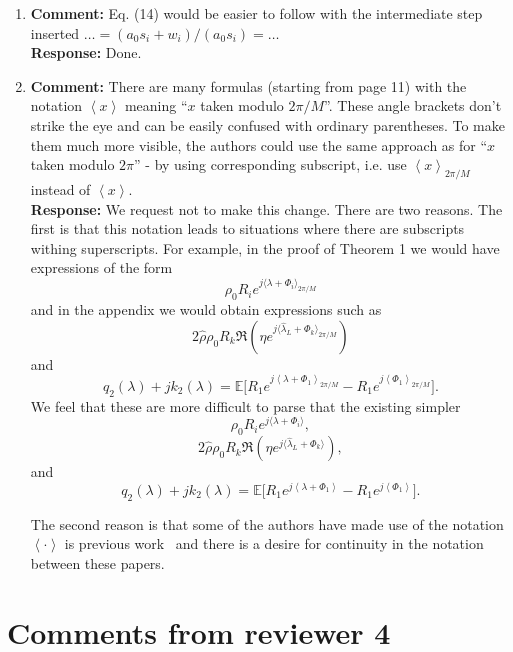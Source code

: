 \documentclass{article}
\newcommand{\fracpart}[1]{\left\langle #1 \right\rangle}
\newcommand{\sfracpart}[1]{\langle #1 \rangle}
\newcommand{\expect}{{\mathbb E}}
\begin{document}
\begin{enumerate}

\item \textbf{Comment:}  Eq. (14) would be easier to follow with the intermediate step inserted $\dots = (a_0s_i + w_i)/(a_0s_i) = \dots$ \\
\textbf{Response:} Done.

\item \textbf{Comment:}  There are many formulas (starting from page 11) with the notation $\fracpart{x}$ meaning ``$x$ taken modulo $2\pi/M$''. These angle brackets don't strike the eye and can be easily confused with ordinary parentheses. To make them much more visible, the authors could use the same approach as for ``$x$ taken modulo $2\pi$'' - by using corresponding subscript, i.e. use $\fracpart{x}_{2\pi/M}$ instead of $\fracpart{x}$. \\
\textbf{Response:} We request not to make this change.  There are two reasons.  The first is that this notation leads to situations where there are subscripts withing superscripts.  For example, in the proof of Theorem 1 we would have expressions of the form
\[
\rho_0 R_i e^{j\sfracpart{\lambda + \Phi_i}_{2\pi/M}}
\]
and in the appendix we would obtain expressions such as
\[
2 \hat{\rho} \rho_0 R_k \Re\left( \eta e^{j\sfracpart{\hat{\lambda}_L + \Phi_k}_{2\pi/M}}\right)
\]
and
\[
q_2(\lambda) + j k_2(\lambda) = \expect\big[ R_1 e^{j\fracpart{\lambda + \Phi_1}_{2\pi/M}} - R_1 e^{j\fracpart{\Phi_1}_{2\pi/M}}  \big].
\]
We feel that these are more difficult to parse that the existing simpler
\[
\rho_0 R_i e^{j\sfracpart{\lambda + \Phi_i}},
\]
\[
2 \hat{\rho} \rho_0 R_k \Re\left( \eta e^{j\sfracpart{\hat{\lambda}_L + \Phi_k}}\right),
\]
and
\[
q_2(\lambda) + j k_2(\lambda) = \expect\big[ R_1 e^{j\fracpart{\lambda + \Phi_1}} - R_1 e^{j\fracpart{\Phi_1}}  \big].
\]

The second reason is that some of the authors have made use of the notation $\fracpart{\cdot}$ is previous work~\cite{McKilliamFrequencyEstimationByPhaseUnwrapping2009,McKilliam_mean_dir_est_sq_arc_length2010,McKilliam_pps_unwrapping_tsp_2014} and there is a desire for continuity in the notation between these papers.

 \end{enumerate}

\section{Comments from reviewer 4}
\end{document}
